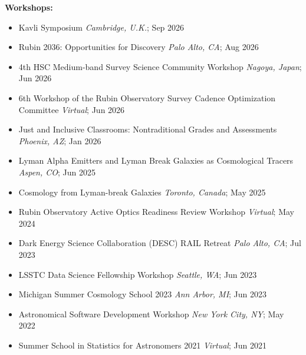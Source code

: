 \textbf{Workshops:}
\begin{itemize}
    \item Kavli Symposium \hfill \textit{Cambridge, U.K.}; Sep 2026
    \item Rubin 2036: Opportunities for Discovery \hfill \textit{Palo Alto, CA}; Aug 2026
    \item 4th HSC Medium-band Survey Science Community Workshop \hfill \textit{Nagoya, Japan}; Jun 2026
    \item 6th Workshop of the Rubin Observatory Survey Cadence Optimization Committee \hfill \textit{Virtual}; Jun 2026
    \item Just and Inclusive Classrooms: Nontraditional Grades and Assessments \hfill \textit{Phoenix, AZ}; Jan 2026
    \item Lyman Alpha Emitters and Lyman Break Galaxies as Cosmological Tracers \hfill \textit{Aspen, CO}; Jun 2025
    \item Cosmology from Lyman-break Galaxies \hfill \textit{Toronto, Canada}; May 2025
    \item Rubin Observatory Active Optics Readiness Review Workshop \hfill \textit{Virtual}; May 2024
    \item Dark Energy Science Collaboration (DESC) RAIL Retreat \hfill \textit{Palo Alto, CA}; Jul 2023
    \item LSSTC Data Science Fellowship Workshop \hfill \textit{Seattle, WA}; Jun 2023
    \item Michigan Summer Cosmology School 2023 \hfill \textit{Ann Arbor, MI}; Jun 2023
    \item Astronomical Software Development Workshop \hfill \textit{New York City, NY}; May 2022
    \item Summer School in Statistics for Astronomers 2021 \hfill \textit{Virtual}; Jun 2021
\end{itemize}


